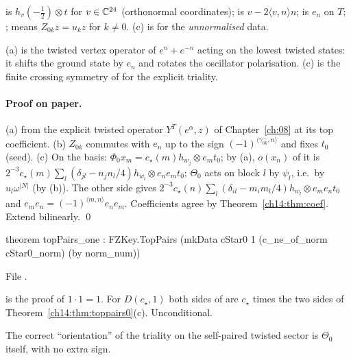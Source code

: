 \begin{dictionary}
 is $h_v(-\tfrac12)\otimes t$ for $v\in{\mathbb{C}}^{24}$ (orthonormal coordinates);  is
$v-2\langle v,n\rangle n$;  is $e_n$ on $T$; ;  means
$Z_{0k}z=u_kz$ for $k\ne0$.  (c) is for the \emph{unnormalised} data.
\end{dictionary}

\begin{physics}
(a) is the twisted vertex operator of $e^n+e^{-n}$ acting on the lowest twisted states: it shifts the
ground state by $e_n$ and rotates the oscillator polarisation.  (c) is the finite crossing symmetry
of  for the explicit triality.
\end{physics}

\paragraph{Proof on paper.}  (a) from the explicit twisted operator $Y^T(e^\alpha,z)$ of Chapter~\ref{ch:08} at its
top coefficient.  (b) $Z_{0k}$ commutes with $e_n$ up to the sign $(-1)^{\langle\gamma^-_{0k},n\rangle}$ and fixes
$t_0$ (seed).  (c) On the basis: $\Phi_0x_m=c_\star(m)h_{w_j}\otimes e_mt_0$; by (a), $o(x_n)$ of it is
$2^{-3}c_\star(m)\sum_l(\delta_{jl}-n_jn_l/4)h_{w_l}\otimes e_ne_mt_0$; $\Theta_0$ acts on block $l$ by $\psi_l$, i.e.\ by
$u_l\omega^{|N|}$ (by (b)).  The other side gives $2^{-3}c_\star(n)\sum_l(\delta_{il}-m_im_l/4)h_{w_l}\otimes e_me_nt_0$ and
$e_me_n=(-1)^{\langle m,n\rangle}e_ne_m$.  Coefficients agree by Theorem~\ref{ch14:thm:coef}.  Extend
bilinearly. \qed

\begin{theorem}[\lean{TopPairs} with $\varepsilon=+1$]\label{ch14:thm:topone}
\begin{leancode}
theorem topPairs_one :
    FZKey.TopPairs (mkData cStar0 1 (c_ne_of_norm cStar0_norm) (by norm_num))
\end{leancode}
File .
\end{theorem}

\begin{dictionary}
 is the proof of $1\cdot1=1$.  For $D(c_\star,1)$ both sides of  are $c_\star$
times the two sides of Theorem~\ref{ch14:thm:toppairs0}(c).  Unconditional.
\end{dictionary}

\begin{physics}
The correct ``orientation'' of the triality on the self-paired twisted sector is $\Theta_0$ itself,
with no extra sign.
\end{physics}

